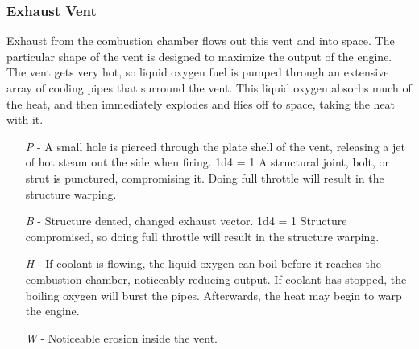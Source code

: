 \documentclass[a4paper]{article}
\begin{document}
\vspace{-0.5cm} \hspace{-18pt} \subsubsection{Exhaust Vent} \label{engine_exhaust} \vspace{-0.2cm}
Exhaust from the combustion chamber flows out this vent and into space. The particular shape of the vent is designed to maximize the output of the engine. The vent gets very hot, so liquid oxygen fuel is pumped through an extensive array of cooling pipes that surround the vent. This liquid oxygen absorbs much of the heat, and then immediately explodes and flies off to space, taking the heat with it.
\begin{enumerate}
\item [\textit{P}] - A small hole is pierced through the plate shell of the vent, releasing a jet of hot steam out the side when firing. \newline \hspace{-3pt} 1d4 = 1 A structural joint, bolt, or strut is punctured, compromising it. Doing full throttle will result in the structure warping.
\item [\textit{B}] - Structure dented, changed exhaust vector. \newline \hspace{3pt} 1d4 = 1 Structure compromised, so doing full throttle will result in the structure warping.
\item [\textit{H}] - If coolant is flowing, the liquid oxygen can boil before it reaches the combustion chamber, noticeably reducing output. If coolant has stopped, the boiling oxygen will burst the pipes. Afterwards, the heat may begin to warp the engine.
\item [\textit{W}] - Noticeable erosion inside the vent.
\end{enumerate}
\end{document}
